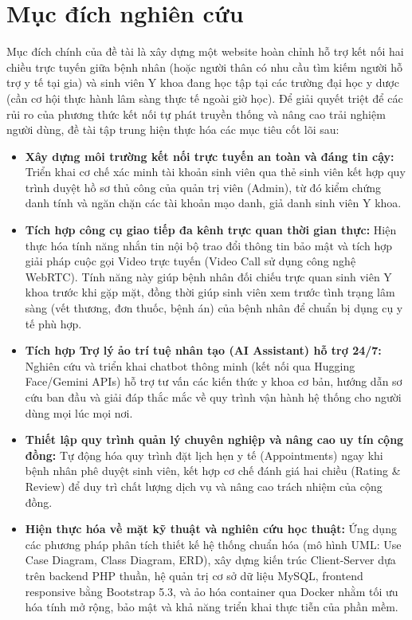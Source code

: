 \documentclass[13pt,a4paper]{extreport}
\begin{document}
\section{Mục đích nghiên cứu}
Mục đích chính của đề tài là xây dựng một website hoàn chỉnh hỗ trợ kết nối hai chiều trực tuyến giữa bệnh nhân (hoặc người thân có nhu cầu tìm kiếm người hỗ trợ y tế tại gia) và sinh viên Y khoa đang học tập tại các trường đại học y dược (cần cơ hội thực hành lâm sàng thực tế ngoài giờ học). Để giải quyết triệt để các rủi ro của phương thức kết nối tự phát truyền thống và nâng cao trải nghiệm người dùng, đề tài tập trung hiện thực hóa các mục tiêu cốt lõi sau:
\begin{itemize}
    \item \textbf{Xây dựng môi trường kết nối trực tuyến an toàn và đáng tin cậy:} Triển khai cơ chế xác minh tài khoản sinh viên qua thẻ sinh viên kết hợp quy trình duyệt hồ sơ thủ công của quản trị viên (Admin), từ đó kiểm chứng danh tính và ngăn chặn các tài khoản mạo danh, giả danh sinh viên Y khoa.
    \item \textbf{Tích hợp công cụ giao tiếp đa kênh trực quan thời gian thực:} Hiện thực hóa tính năng nhắn tin nội bộ trao đổi thông tin bảo mật và tích hợp giải pháp cuộc gọi Video trực tuyến (Video Call sử dụng công nghệ WebRTC). Tính năng này giúp bệnh nhân đối chiếu trực quan sinh viên Y khoa trước khi gặp mặt, đồng thời giúp sinh viên xem trước tình trạng lâm sàng (vết thương, đơn thuốc, bệnh án) của bệnh nhân để chuẩn bị dụng cụ y tế phù hợp.
    \item \textbf{Tích hợp Trợ lý ảo trí tuệ nhân tạo (AI Assistant) hỗ trợ 24/7:} Nghiên cứu và triển khai chatbot thông minh (kết nối qua Hugging Face/Gemini APIs) hỗ trợ tư vấn các kiến thức y khoa cơ bản, hướng dẫn sơ cứu ban đầu và giải đáp thắc mắc về quy trình vận hành hệ thống cho người dùng mọi lúc mọi nơi.
    \item \textbf{Thiết lập quy trình quản lý chuyên nghiệp và nâng cao uy tín cộng đồng:} Tự động hóa quy trình đặt lịch hẹn y tế (Appointments) ngay khi bệnh nhân phê duyệt sinh viên, kết hợp cơ chế đánh giá hai chiều (Rating \& Review) để duy trì chất lượng dịch vụ và nâng cao trách nhiệm của cộng đồng.
    \item \textbf{Hiện thực hóa về mặt kỹ thuật và nghiên cứu học thuật:} Ứng dụng các phương pháp phân tích thiết kế hệ thống chuẩn hóa (mô hình UML: Use Case Diagram, Class Diagram, ERD), xây dựng kiến trúc Client-Server dựa trên backend PHP thuần, hệ quản trị cơ sở dữ liệu MySQL, frontend responsive bằng Bootstrap 5.3, và ảo hóa container qua Docker nhằm tối ưu hóa tính mở rộng, bảo mật và khả năng triển khai thực tiễn của phần mềm.
\end{itemize}
\end{document}
